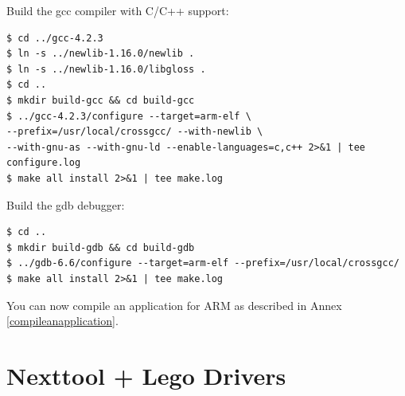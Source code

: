 Build the gcc compiler with C/C++ support:

\begin{verbatim}
$ cd ../gcc-4.2.3
$ ln -s ../newlib-1.16.0/newlib .
$ ln -s ../newlib-1.16.0/libgloss .
$ cd ..
$ mkdir build-gcc && cd build-gcc
$ ../gcc-4.2.3/configure --target=arm-elf \
--prefix=/usr/local/crossgcc/ --with-newlib \
--with-gnu-as --with-gnu-ld --enable-languages=c,c++ 2>&1 | tee configure.log
$ make all install 2>&1 | tee make.log
\end{verbatim}

Build the gdb debugger:

\begin{verbatim}
$ cd ..
$ mkdir build-gdb && cd build-gdb
$ ../gdb-6.6/configure --target=arm-elf --prefix=/usr/local/crossgcc/
$ make all install 2>&1 | tee make.log
\end{verbatim}

You can now compile an application for ARM as described in Annex \ref{compileanapplication}.

\section{Nexttool + Lego Drivers} \label{drivers}
